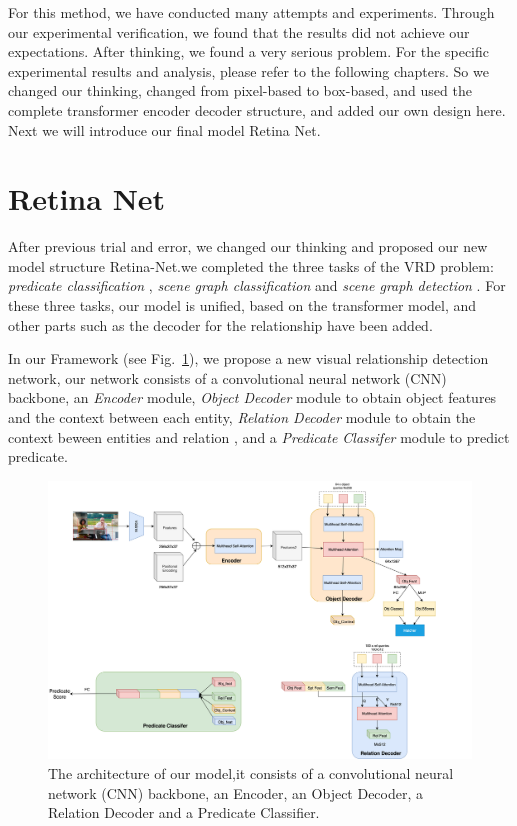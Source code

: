 For this method, we have conducted many attempts and experiments. Through our experimental verification, we found that the results did not achieve our expectations. After thinking, we found a very serious problem. For the specific experimental results and analysis, please refer to the following chapters. So we changed our thinking, changed from pixel-based to box-based, and used the complete transformer encoder decoder structure, and added our own design here. Next we will introduce our final model Retina Net.

\section{Retina Net}
\label{sec:retinanet}
After previous trial and error, we changed our thinking and proposed our new model structure Retina-Net.we completed the three tasks of the VRD problem: \textit{predicate classification} , \textit{scene graph classification} and \textit{scene graph detection} . For these three tasks, our model is unified, based on the transformer model, and other parts such as the decoder for the relationship have been added.

In our Framework (see Fig.~\ref{fig:my_model}), we propose a new visual relationship detection network, our network consists of a convolutional neural network (CNN) backbone, an \textit{Encoder} module, \textit{Object Decoder} module to obtain object features and  the context between each entity, \textit{Relation Decoder} module to obtain the context beween entities and relation  , and a \textit{Predicate Classifer} module to predict predicate.

\begin{figure}[!htbp]
	\centering
	\includegraphics[width = 1\textwidth]{figures/my_model.png}
	\caption[The architecture of our model.]
	{The architecture of our model,it consists of a convolutional neural network (CNN) backbone, an Encoder, an Object Decoder, a Relation Decoder and a Predicate Classifier.}
	\label{fig:my_model}
\end{figure}


